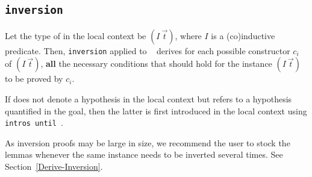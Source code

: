 \begin{coq_example*}

\subsection{\tt inversion \ident}

Let the type of {\ident} in the local context be $(I~\vec{t})$,
where $I$ is a (co)inductive predicate. Then,
\texttt{inversion} applied to \ident~ derives for each possible
constructor $c_i$ of $(I~\vec{t})$, {\bf all} the necessary
conditions that should hold for the instance $(I~\vec{t})$ to be
proved by $c_i$.

\Rem If {\ident} does not denote a hypothesis in the local context
but refers to a hypothesis quantified in the goal, then the
latter is first introduced in the local context using
\texttt{intros until \ident}.

\Rem As inversion proofs may be large in size, we recommend the user to
stock the lemmas whenever the same instance needs to be inverted
several times. See Section~\ref{Derive-Inversion}.

\end{coq_example*}
